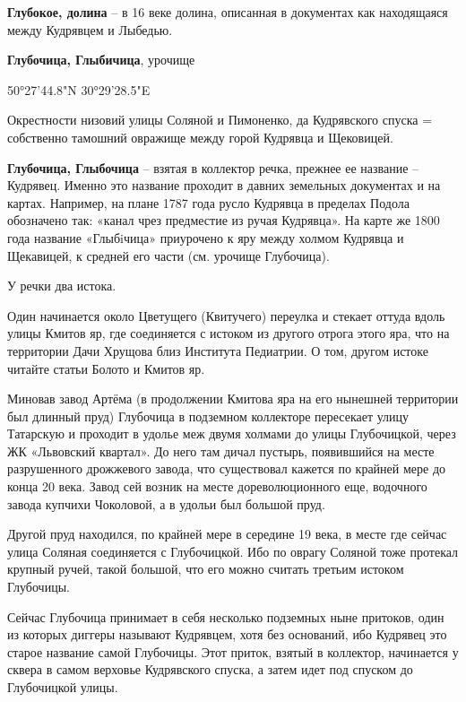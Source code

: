 \medskip

\textbf{Глубокое, долина} – в 16 веке долина, описанная в документах как находящаяся между Кудрявцем и Лыбедью.\\

\medskip

\textbf{Глубочица, Глыбичица}, урочище

50°27'44.8"N 30°29'28.5"E

Окрестности низовий улицы Соляной и Пимоненко, да Кудрявского спуска = собственно тамошний овражище между горой Кудрявца и Щековицей.\\

\medskip


\textbf{Глубочица, Глыбочица} – взятая в коллектор речка, прежнее ее название – Кудрявец. Именно это название проходит в давних земельных документах и на картах. Например, на плане 1787 года русло Кудрявца в пределах Подола обозначено так: «канал чрез предместие из ручая Кудрявца». На карте же 1800 года название «Глыбiчица» приурочено к яру между холмом Кудрявца и Щекавицей, к средней его части (см. урочище Глубочица).

У речки два истока. 

Один начинается около Цветущего (Квитучего) переулка и стекает оттуда вдоль улицы Кмитов яр, где соединяется с истоком из другого отрога этого яра, что на территории Дачи Хрущова близ Института Педиатрии. О том, другом истоке читайте статьи Болото и Кмитов яр.

Миновав завод Артёма (в продолжении Кмитова яра на его нынешней территории был длинный пруд) Глубочица в подземном коллекторе пересекает улицу Татарскую и проходит в удолье меж двумя холмами до улицы Глубочицкой, через ЖК «Львовский квартал». До него там дичал пустырь, появившийся на месте разрушенного дрожжевого завода, что существовал кажется по крайней мере до конца 20 века. Завод сей возник на месте дореволюционного еще, водочного завода купчихи Чоколовой, а в удольи был большой пруд.

Другой пруд находился, по крайней мере в середине 19 века, в месте где сейчас улица Соляная соединяется с Глубочицкой. Ибо по оврагу Соляной тоже протекал крупный ручей, такой большой, что его можно считать третьим истоком Глубочицы.

Сейчас Глубочица принимает в себя несколько подземных ныне притоков, один из которых диггеры называют Кудрявцем, хотя без оснований, ибо Кудрявец это старое название самой Глубочицы. Этот приток, взятый в коллектор, начинается у сквера в самом верховье Кудрявского спуска, а затем идет под спуском до Глубочицкой улицы.

